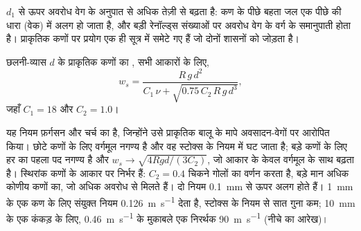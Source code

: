 $d_1$ से ऊपर अवरोध वेग के अनुपात से अधिक तेज़ी से बढ़ता है: कण के पीछे बहता जल एक पीछे की धारा (वेक) में अलग हो जाता है, और बड़ी रेनॉल्ड्स संख्याओं पर अवरोध वेग के वर्ग के समानुपाती होता है। प्राकृतिक कणों पर प्रयोग एक ही सूत्र में समेटे गए हैं जो दोनों शासनों को जोड़ता है।

\begin{proposition}[संयुक्त अवसादन-नियम]\label{prop:b1:erosion-transport:combined}
छलनी-व्यास $d$ के प्राकृतिक कणों का , सभी आकारों के लिए,
\[
  w_s = \frac{R\,g\,d^2}{C_1\,\nu + \sqrt{0.75\,C_2\,R\,g\,d^3}},
\]
जहाँ $C_1 = 18$ और $C_2 = 1.0$।
\end{proposition}
\admitted

यह नियम फ़र्गसन और चर्च का है, जिन्होंने उसे प्राकृतिक बालू के मापे अवसादन-वेगों पर आरोपित किया। छोटे कणों के लिए वर्गमूल नगण्य है और वह स्टोक्स के नियम में घट जाता है; बड़े कणों के लिए हर का पहला पद नगण्य है और $w_s \to \sqrt{4 R g d/(3 C_2)}$, जो आकार के केवल वर्गमूल के साथ बढ़ता है। स्थिरांक कणों के आकार पर निर्भर हैं: $C_2 = 0.4$ चिकने गोलों का वर्णन करता है, बड़े मान अधिक कोणीय कणों का, जो अधिक अवरोध से मिलते हैं। दो नियम \qty{0.1}{mm} से ऊपर अलग होते हैं। \qty{1}{mm} के एक कण के लिए संयुक्त नियम \qty{0.126}{m.s^{-1}} देता है, स्टोक्स के नियम से सात गुना कम; \qty{10}{mm} के एक कंकड़ के लिए, \qty{0.46}{m.s^{-1}} के मुकाबले एक निरर्थक \qty{90}{m.s^{-1}} (नीचे का आरेख)।

